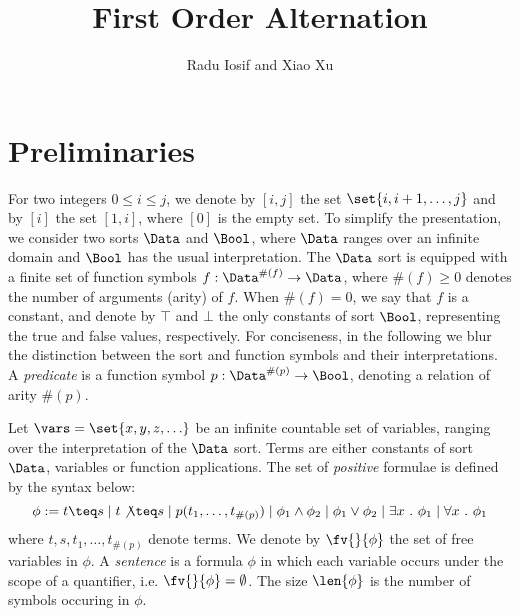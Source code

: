 \documentclass{llncs}
\begin{document}

\title{First Order Alternation}

\author{Radu Iosif and Xiao Xu}

\maketitle

\begin{abstract}
\end{abstract}

\section{Preliminaries}

For two integers $0 \leq i \leq j$, we denote by $[i,j]$ the set
$\set{i,i+1,\ldots,j}$ and by $[i]$ the set $[1,i]$, where $[0]$ is
the empty set. To simplify the presentation, we consider two sorts
$\Data$ and $\Bool$, where $\Data$ ranges over an infinite domain and
$\Bool$ has the usual interpretation. The $\Data$ sort is equipped
with a finite set of function symbols $f : \Data^{\#(f)} \rightarrow
\Data$, where $\#(f)\geq0$ denotes the number of arguments (arity) of
$f$. When $\#(f)=0$, we say that $f$ is a constant, and denote by
$\top$ and $\bot$ the only constants of sort $\Bool$, representing the
true and false values, respectively.  For conciseness, in the
following we blur the distinction between the sort and function
symbols and their interpretations. A \emph{predicate} is a function
symbol $p : \Data^{\#(p)} \rightarrow \Bool$, denoting a relation of
arity $\#(p)$.

Let $\vars = \set{x,y,z,\ldots}$ be an infinite countable set of
variables, ranging over the interpretation of the $\Data$ sort. Terms
are either constants of sort $\Data$, variables or function
applications. The set of \emph{positive} formulae is defined by the
syntax below: 
\[\phi := t \teq s \mid t \not\teq s \mid p(t_1,\ldots,t_{\#(p)}) 
\mid \phi_1 \wedge \phi_2 \mid \phi_1 \vee \phi_2 \mid \exists x ~.~
\phi_1 \mid \forall x ~.~ \phi_1\] where $t,s,t_1,\ldots,t_{\#(p)}$
denote terms. We denote by $\fv{}{\phi}$ the set of free variables in
$\phi$. A \emph{sentence} is a formula $\phi$ in which each variable
occurs under the scope of a quantifier, i.e. $\fv{}{\phi} =
\emptyset$. The size $\len{\phi}$ is the number of symbols occuring in
$\phi$. 
\end{document}
